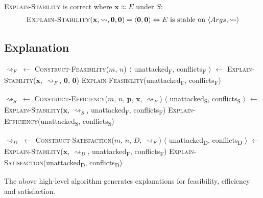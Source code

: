 \begin{theorem}
	\textsc{Explain-Stability} is correct where $\mathbf{x}\approx E$ under $S$:
	\begin{align*}
		\textsc{Explain-Stability}(\mathbf{x},\rightsquigarrow,\mathbf{0},\mathbf{0})=\langle \mathbf{0},\mathbf{0}\rangle\Leftrightarrow E\text{ is stable on }\langle Args, \rightsquigarrow\rangle
	\end{align*}
\end{theorem}
	
\subsection{Explanation}

\begin{algorithm}[H]
	\caption{}
	\begin{algorithmic}[1]
				\State $\rightsquigarrow_F$ $\gets$ \textsc{Construct-Feasibility}($m$, $n$)
				\State $\langle$ unattacked\textsubscript{F}, conflicts\textsubscript{F} $\rangle$ $\gets$ \textsc{Explain-Stability}($\mathbf{x}$, $\rightsquigarrow_F$, $\mathbf{0}$, $\mathbf{0}$)
				\State\textsc{Explain-Feasibility}(unattacked\textsubscript{F}, conflicts\textsubscript{F})

				\State $\rightsquigarrow_S$ $\gets$ \textsc{Construct-Efficiency}($m$, $n$, $\mathbf{p}$, $\mathbf{x}$, $\rightsquigarrow_F$)
				\State $\langle$ unattacked\textsubscript{S}, conflicts\textsubscript{S} $\rangle$ $\gets$ \textsc{Explain-Stability}($\mathbf{x}$, $\rightsquigarrow_S$, unattacked\textsubscript{F}, conflicts\textsubscript{F})
				\State\textsc{Explain-Efficiency}(unattacked\textsubscript{S}, conflicts\textsubscript{S})

				\State $\rightsquigarrow_D$ $\gets$ \textsc{Construct-Satisfaction}($m$, $n$, $D$, $\rightsquigarrow_F$)
				\State $\langle$ unattacked\textsubscript{D}, conflicts\textsubscript{D} $\rangle$ $\gets$ \textsc{Explain-Stability}($\mathbf{x}$, $\rightsquigarrow_D$, unattacked\textsubscript{F}, conflicts\textsubscript{F})
				\State\textsc{Explain-Satisfaction}(unattacked\textsubscript{D}, conflicts\textsubscript{D})
		\EndFunction
	\end{algorithmic}
\end{algorithm}

The above high-level algorithm generates explanations for feasibility, efficiency and satisfaction.